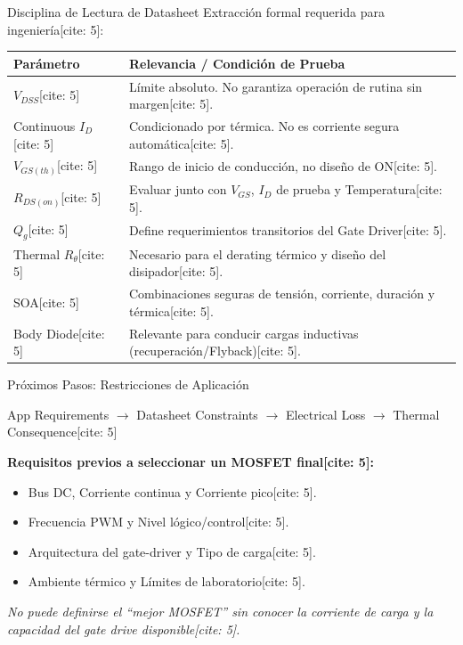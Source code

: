 \documentclass[aspectratio=169, table]{beamer}
\begin{document}
\begin{frame}{Disciplina de Lectura de Datasheet}
    Extracción formal requerida para ingeniería[cite: 5]:
    
    \vspace{0.1cm}
    {\small
    \renewcommand{\arraystretch}{1.1}
    \begin{tabularx}{\textwidth}{@{}l>{\raggedright\arraybackslash}X@{}}
    \toprule
    \textbf{Parámetro} & \textbf{Relevancia / Condición de Prueba} \\ \midrule
    $V_{DSS}$[cite: 5] & Límite absoluto. No garantiza operación de rutina sin margen[cite: 5]. \\
    Continuous $I_D$[cite: 5] & Condicionado por térmica. No es corriente segura automática[cite: 5]. \\
    $V_{GS(th)}$[cite: 5] & Rango de inicio de conducción, no diseño de ON[cite: 5]. \\
    $R_{DS(on)}$[cite: 5] & Evaluar junto con $V_{GS}$, $I_D$ de prueba y Temperatura[cite: 5]. \\
    $Q_g$[cite: 5] & Define requerimientos transitorios del Gate Driver[cite: 5]. \\
    Thermal $R_{\theta}$[cite: 5] & Necesario para el derating térmico y diseño del disipador[cite: 5]. \\
    SOA[cite: 5] & Combinaciones seguras de tensión, corriente, duración y térmica[cite: 5]. \\
    Body Diode[cite: 5] & Relevante para conducir cargas inductivas (recuperación/Flyback)[cite: 5]. \\ \bottomrule
    \end{tabularx}
    }
\end{frame}

\begin{frame}{Próximos Pasos: Restricciones de Aplicación}
    \begin{tcolorbox}[colback=white, colframe=ucbblue, title=Cadena de Ingeniería {[cite: 5]}]
        \centering \small
        App Requirements $\rightarrow$ Datasheet Constraints $\rightarrow$ Electrical Loss $\rightarrow$ Thermal Consequence[cite: 5]
    \end{tcolorbox}
    
    \textbf{Requisitos previos a seleccionar un MOSFET final[cite: 5]:}
    \begin{itemize}
        \item Bus DC, Corriente continua y Corriente pico[cite: 5].
        \item Frecuencia PWM y Nivel lógico/control[cite: 5].
        \item Arquitectura del gate-driver y Tipo de carga[cite: 5].
        \item Ambiente térmico y Límites de laboratorio[cite: 5].
    \end{itemize}
    
    \begin{center}
        \textit{No puede definirse el ``mejor MOSFET'' sin conocer la corriente de carga y la capacidad del gate drive disponible[cite: 5].}
    \end{center}
\end{frame}
\end{document}
